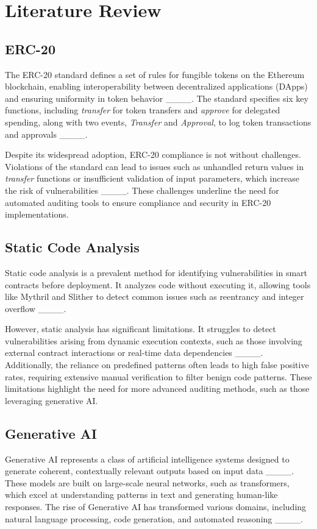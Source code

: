 \section{Literature Review}
\subsection{ERC-20}
The ERC-20 standard defines a set of rules for fungible tokens on the Ethereum blockchain, enabling interoperability between decentralized applications (DApps) and ensuring uniformity in token behavior ____. The standard specifies six key functions, including \textit{transfer} for token transfers and \textit{approve} for delegated spending, along with two events, \textit{Transfer} and \textit{Approval}, to log token transactions and approvals ____.

Despite its widespread adoption, ERC-20 compliance is not without challenges. Violations of the standard can lead to issues such as unhandled return values in \textit{transfer} functions or insufficient validation of input parameters, which increase the risk of vulnerabilities ____. These challenges underline the need for automated auditing tools to ensure compliance and security in ERC-20 implementations.

\subsection{Static Code Analysis}
Static code analysis is a prevalent method for identifying vulnerabilities in smart contracts before deployment. It analyzes code without executing it, allowing tools like Mythril and Slither to detect common issues such as reentrancy and integer overflow ____.

However, static analysis has significant limitations. It struggles to detect vulnerabilities arising from dynamic execution contexts, such as those involving external contract interactions or real-time data dependencies ____. Additionally, the reliance on predefined patterns often leads to high false positive rates, requiring extensive manual verification to filter benign code patterns. These limitations highlight the need for more advanced auditing methods, such as those leveraging generative AI.

\subsection{Generative AI}
Generative AI represents a class of artificial intelligence systems designed to generate coherent, contextually relevant outputs based on input data ____. These models are built on large-scale neural networks, such as transformers, which excel at understanding patterns in text and generating human-like responses. The rise of Generative AI has transformed various domains, including natural language processing, code generation, and automated reasoning ____.

